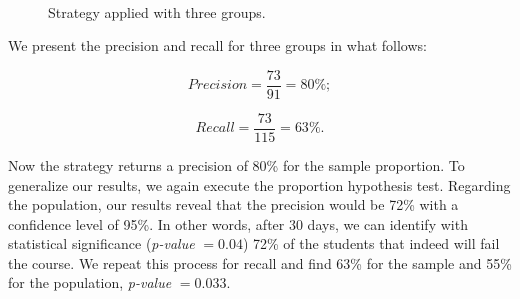 \begin{figure}[ht]
\begin{center}
{             \label{fig:3-2013-01}
         }\\
     \end{center}
     \caption{Strategy applied with three groups.}
	 \label{fig:3-groups}
\end{figure}

We present the precision and recall for three groups in what follows:

\vspace{0.2cm}
\noindent
\begin{minipage}{.5\linewidth}
\centering
$$
Precision = \frac{73}{91} = 80\%;
$$
\end{minipage}
\begin{minipage}{.5\linewidth}
$$
Recall = \frac{73}{115} = 63\%.
$$
\end{minipage}
\vspace{0.2cm}

Now the strategy returns a precision of 80\% for the sample proportion. To generalize our results, we again execute the proportion hypothesis test. Regarding the population, our results reveal that the precision would be 72\% with a confidence level of 95\%. In other words, after 30 days, we can identify with statistical significance (\textit{p-value} $= 0.04$) 72\% of the students that indeed will fail the course. We repeat this process for recall and find 63\% for the sample and 55\% for the population, \textit{p-value} $= 0.033$.


